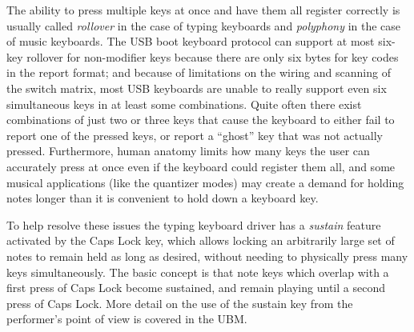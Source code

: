 The ability to press multiple keys at once and have them all register
correctly is usually called \emph{rollover} in the case of typing keyboards
and \emph{polyphony} in the case of music keyboards.  The USB boot keyboard
protocol can support at most six-key rollover for non-modifier keys
because there are only six bytes for key codes in the report format; and
because of limitations on the wiring and scanning of the switch matrix, most
USB keyboards are unable to really support even six simultaneous keys in at
least some combinations.  Quite often there exist combinations of just
two or three keys that cause the keyboard to either fail to report one of
the pressed keys, or report a ``ghost'' key that was not actually pressed. 
Furthermore, human anatomy limits how many keys the user can accurately
press at once even if the keyboard could register them all, and some musical
applications (like the quantizer modes) may create a demand for holding
notes longer than it is convenient to hold down a keyboard key.

To help resolve these issues the typing keyboard driver has a \emph{sustain}
feature activated by the Caps Lock key, which allows locking an arbitrarily
large set of notes to remain held as long as desired, without needing to
physically press many keys simultaneously.  The basic concept is that note
keys which overlap with a first press of Caps Lock become sustained, and
remain playing until a second press of Caps Lock.  More detail on the use of
the sustain key from the performer's point of view is covered in the UBM.

